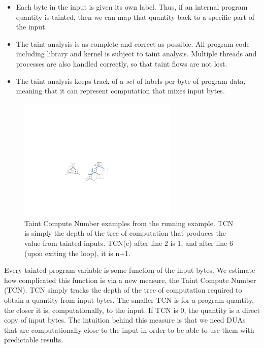 \begin{itemize}
\item Each byte in the input is given its own label.
Thus, if an internal program quantity is tainted, then we can map that quantity back to a specific part of the input.
\item The taint analysis is as complete and correct as possible.  
All program code including library and kernel is subject to taint analysis.
Multiple threads and processes are also handled correctly, so that taint flows are not lost.
\item The taint analysis keeps track of a \emph{set} of labels per byte of program data, meaning that it can represent computation that mixes input bytes.
\end{itemize}

\begin{figure}
\centering
\includegraphics[width=3in]{tcn.pdf}
\caption{Taint Compute Number examples from the running example.  
TCN is simply the depth of the tree of computation that produces the value from tainted inputs.
TCN(c) after line 2 is 1, and after line 6 (upon exiting the loop), it is n+1.}
\label{fig:taint-compute-number}
\end{figure}

\noindent
Every tainted program variable is some function of the input bytes.
We estimate how complicated this function is via a new measure, the Taint Compute Number (TCN).
TCN simply tracks the depth of the tree of computation required to obtain a quantity from input bytes.
The smaller TCN is for a program quantity, the closer it is, computationally, to the input.
If TCN is 0, the quantity is a direct copy of input bytes.
The intuition behind this measure is that we need DUAs that are computationally close to the input in order to be able to use them with predictable results.

